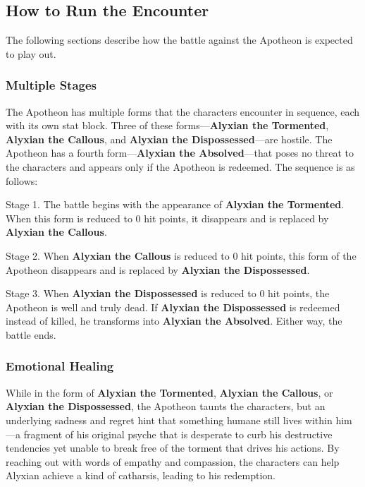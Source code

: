 \documentclass[letterpaper, 11pt, bg=full, twocolumn]{dndbook}
\begin{document}
\subsection{How to Run the Encounter}

The following sections describe how the battle against the Apotheon is expected to play out.

\subsubsection{Multiple Stages}

The Apotheon has multiple forms that the characters encounter in sequence, each with its own stat block. Three of these forms---\textbf{Alyxian the Tormented}, \textbf{Alyxian the Callous}, and \textbf{Alyxian the Dispossessed}---are hostile. The Apotheon has a fourth form---\textbf{Alyxian the Absolved}---that poses no threat to the characters and appears only if the Apotheon is redeemed. The sequence is as follows:

Stage 1. The battle begins with the appearance of \textbf{Alyxian the Tormented}. When this form is reduced to 0 hit points, it disappears and is replaced by \textbf{Alyxian the Callous}.

Stage 2. When \textbf{Alyxian the Callous} is reduced to 0 hit points, this form of the Apotheon disappears and is replaced by \textbf{Alyxian the Dispossessed}.

Stage 3. When \textbf{Alyxian the Dispossessed} is reduced to 0 hit points, the Apotheon is well and truly dead. If \textbf{Alyxian the Dispossessed} is redeemed instead of killed, he transforms into \textbf{Alyxian the Absolved}. Either way, the battle ends.

\subsubsection{Emotional Healing}

While in the form of \textbf{Alyxian the Tormented}, \textbf{Alyxian the Callous}, or \textbf{Alyxian the Dispossessed}, the Apotheon taunts the characters, but an underlying sadness and regret hint that something humane still lives within him---a fragment of his original psyche that is desperate to curb his destructive tendencies yet unable to break free of the torment that drives his actions. By reaching out with words of empathy and compassion, the characters can help Alyxian achieve a kind of catharsis, leading to his redemption.
\end{document}
